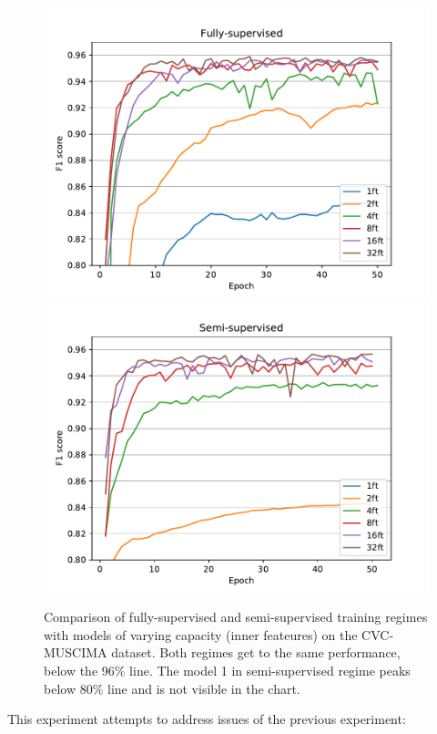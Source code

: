 \begin{figure}[p]
    \centering
    \includegraphics[width=140mm]{../../figures/02-cvc-improvements/supervised.pdf}
    \includegraphics[width=140mm]{../../figures/02-cvc-improvements/semisupervised.pdf}
    \caption{Comparison of fully-supervised and semi-supervised training regimes with models of varying capacity (inner feateures) on the CVC-MUSCIMA dataset. Both regimes get to the same performance, below the 96\% line. The model 1 in semi-supervised regime peaks below 80\% line and is not visible in the chart.}
    \label{fig:CvcImprovements}
\end{figure}

This experiment attempts to address issues of the previous experiment:

